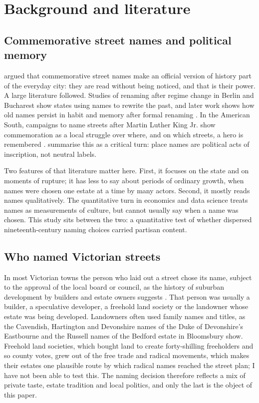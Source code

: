 \documentclass[11pt,a4paper]{article}
\begin{document}
\section{Background and literature}
\subsection{Commemorative street names and political memory}
\citet{azaryahu1996} argued that commemorative street names make an official version of history part of the everyday city: they are read without being noticed, and that is their power. A large literature followed. Studies of renaming after regime change in Berlin \citep{azaryahu1997} and Bucharest \citep{light2004} show states using names to rewrite the past, and later work shows how old names persist in habit and memory after formal renaming \citep{lightyoung2014}. In the American South, campaigns to name streets after Martin Luther King Jr. show commemoration as a local struggle over where, and on which streets, a hero is remembered \citep{alderman2000,alderman2003}. \citet{roseredwood2010} summarise this as a critical turn: place names are political acts of inscription, not neutral labels.

Two features of that literature matter here. First, it focuses on the state and on moments of rupture; it has less to say about periods of ordinary growth, when names were chosen one estate at a time by many actors. Second, it mostly reads names qualitatively. The quantitative turn in economics and data science \citep{oto2018,gutierrez2022,bancilhon2021} treats names as measurements of culture, but cannot usually say when a name was chosen. This study sits between the two: a quantitative test of whether dispersed nineteenth-century naming choices carried partisan content.

\subsection{Who named Victorian streets}
In most Victorian towns the person who laid out a street chose its name, subject to the approval of the local board or council, as the history of suburban development by builders and estate owners suggests \citep{dyos1961}. That person was usually a builder, a speculative developer, a freehold land society or the landowner whose estate was being developed. Landowners often used family names and titles, as the Cavendish, Hartington and Devonshire names of the Duke of Devonshire's Eastbourne and the Russell names of the Bedford estate in Bloomsbury show. Freehold land societies, which bought land to create forty-shilling freeholders and so county votes, grew out of the free trade and radical movements, which makes their estates one plausible route by which radical names reached the street plan; I have not been able to test this. The naming decision therefore reflects a mix of private taste, estate tradition and local politics, and only the last is the object of this paper.
\end{document}
